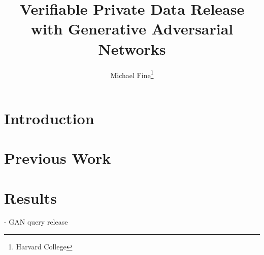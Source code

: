 \documentclass[]{article}
\author{Michael Fine\footnote{Harvard College}}
\title{Verifiable Private Data Release with Generative Adversarial Networks}
\begin{document}
\maketitle


\section{Introduction}



\section{Previous Work}

\section{Results}



- GAN query release 





\newpage

\appendix
\end{document}
